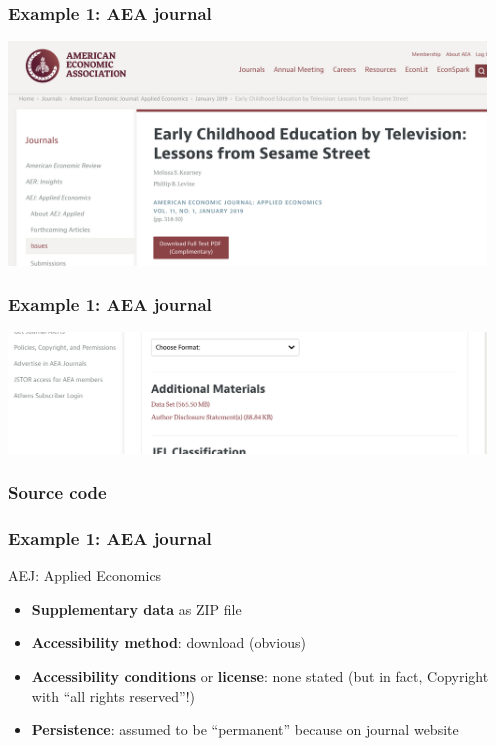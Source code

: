 \begin{frame}
\frametitle{Example 1: AEA journal}
\includegraphics[width=0.95\textwidth]{images/aeaweb-screenshot1.png}
\end{frame}

\begin{frame}
\frametitle{Example 1: AEA journal}
\includegraphics[width=0.95\textwidth]{images/aeaweb-screenshot2.png}
\end{frame}


\begin{frame}
\frametitle{Source code}

\end{frame}

\begin{frame}
\frametitle{Example 1: AEA journal}
\begin{block}{AEJ: Applied Economics}
\begin{itemize}
	\item \textbf{Supplementary data} as ZIP file
	\item \textbf{Accessibility method}: download (obvious)
	\item \textbf{Accessibility conditions} or \textbf{license}: none stated (but in fact, {\color{red}Copyright with ``all rights reserved''}!)
	\item \textbf{Persistence}: assumed to be ``permanent'' because on journal website
\end{itemize}
\end{block}
\end{frame}



